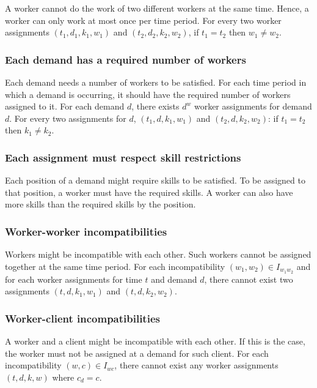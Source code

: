 \documentclass[../thesis.tex]{subfiles}
\begin{document}
A worker cannot do the work of two different workers at the same time.
Hence, a worker can only work at most once per time period.
For every two worker assignments $(t_1, d_1, k_1, w_1)$ and $(t_2, d_2, k_2, w_2)$, if $t_1 = t_2$ then $w_1 \neq w_2$.

\subsubsection{Each demand has a required number of workers}

Each demand needs a number of workers to be satisfied. 
For each time period in which a demand is occurring, it should have the required 
number of workers assigned to it.
For each demand $d$, there exists $d^w$ worker assignments for demand $d$. 
For every two assignments for $d$, $(t_1, d, k_1, w_1)$ and $(t_2, d, k_2, w_2)$: if $t_1 = t_2$ then $k_1 \neq k_2$.

\subsubsection{Each assignment must respect skill restrictions}

Each position of a demand might require skills to be satisfied. 
To be assigned to that position, a worker must have the required skills. 
A worker can also have more skills than the required skills by the position.

\subsubsection{Worker-worker incompatibilities}

Workers might be incompatible with each other. Such workers cannot
be assigned together at the same time period.
For each incompatibility $(w_1, w_2) \in I_{w_1w_2}$ and for each worker assignments for time $t$ and demand $d$,
there cannot exist two assignments $(t, d, k_1, w_1)$ and $(t, d, k_2, w_2)$.

\subsubsection{Worker-client incompatibilities}

A worker and a client might be incompatible with each other. 
If this is the case, the worker must not be assigned at a demand for such client.
For each incompatibility $(w, c) \in I_{wc}$, there cannot exist any worker assignments $(t, d, k, w)$ where 
$c_d = c$.
\end{document}
